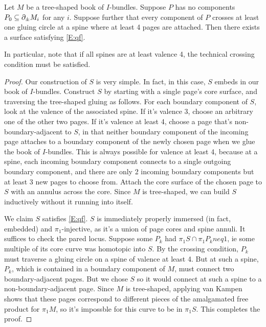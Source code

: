 {\begin{thm}

Let $M$ be a tree-shaped book of $I$-bundles. Suppose $P$ has no components
$P_0 \subseteq \partial_\pm M_i$ for any $i$. Suppose further that every
component of $P$ crosses at least one gluing circle at a spine where at least
4 pages are attached. Then there exists a surface satisfying \eqref{E:qf}.

In particular, note that if all spines are at least valence 4, the technical
crossing condition must be satisfied.

\end{thm}
\begin{proof}

Our construction of $S$ is very simple. In fact, in this case, $S$ embeds in
our book of $I$-bundles. Construct $S$ by starting with a single page's core
surface, and traversing the tree-shaped gluing as follows. For each boundary
component of $S$, look at the valence of the associated spine. If it's valence
3, choose an arbitrary one of the other two pages. If it's valence at least 4,
choose a page that's non-boundary-adjacent to $S$, in that neither boundary
component of the incoming page attaches to a boundary component of the newly
chosen page when we glue the book of $I$-bundles. This is always possible for
valence at least 4, because at a spine, each incoming boundary component
connects to a single outgoing boundary component, and there are only 2 incoming
boundary components but at least 3 new pages to choose from. Attach the core
surface of the chosen page to $S$ with an annulus across the core. Since $M$ is
tree-shaped, we can build $S$ inductively without it running into itself.

We claim $S$ satisfies \eqref{E:qf}. $S$ is immediately properly immersed (in
fact, embedded) and $\pi_1$-injective, as it's a union of page cores and spine
annuli. It suffices to check the pared locus. Suppose some $P_k$ had $\pi_1S
\cap \pi_1P_k neq 1$, ie some multiple of its core curve was homotopic into
$S$. By the crossing condition, $P_k$ must traverse a gluing circle on a spine
of valence at least 4.  But at such a spine, $P_k$, which is contained in
a boundary component of $M$, must connect two boundary-adjacent pages. But we
chose $S$ so it would connect at such a spine to a non-boundary-adjacent page.
Since $M$ is tree-shaped, applying van Kampen shows that these pages correspond
to different pieces of the amalgamated free product for $\pi_1M$, so it's
impossble for this curve to be in $\pi_1S$. This completes the proof.


\end{proof}}
